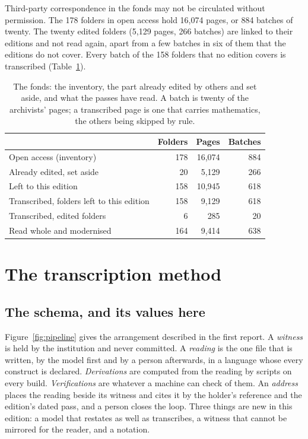 \documentclass[11pt]{article}
\begin{document}
Third-party correspondence in the fonds may not be circulated without permission. The 178 folders in open access hold 16,074 pages, or 884 batches of twenty. The twenty edited folders (5,129 pages, 266 batches) are linked to their editions and not read again, apart from a few batches in six of them that the editions do not cover. Every batch of the 158 folders that no edition covers is transcribed (Table~\ref{tab:coverage}).

\begin{table}[htbp]\centering\small
\caption{The fonds: the inventory, the part already edited by others and set aside, and what the passes have read. A batch is twenty of the archivists' pages; a transcribed page is one that carries mathematics, the others being skipped by rule.}\label{tab:coverage}
\begin{tabular}{lrrr}\toprule
 & Folders & Pages & Batches\\\midrule
Open access (inventory) & 178 & 16,074 & 884\\
Already edited, set aside & 20 & 5,129 & 266\\
Left to this edition & 158 & 10,945 & 618\\\midrule
Transcribed, folders left to this edition & 158 & 9,129 & 618\\
Transcribed, edited folders & 6 & 285 & 20\\
Read whole and modernised & 164 & 9,414 & 638\\\bottomrule
\end{tabular}
\end{table}

\section{The transcription method}



\subsection{The schema, and its values here}

Figure~\ref{fig:pipeline} gives the arrangement described in the first report. A \emph{witness} is held by the institution and never committed. A \emph{reading} is the one file that is written, by the model first and by a person afterwards, in a language whose every construct is declared. \emph{Derivations} are computed from the reading by scripts on every build. \emph{Verifications} are whatever a machine can check of them. An \emph{address} places the reading beside its witness and cites it by the holder's reference and the edition's dated pass, and a person closes the loop. Three things are new in this edition: a model that restates as well as transcribes, a witness that cannot be mirrored for the reader, and a notation.
\end{document}
